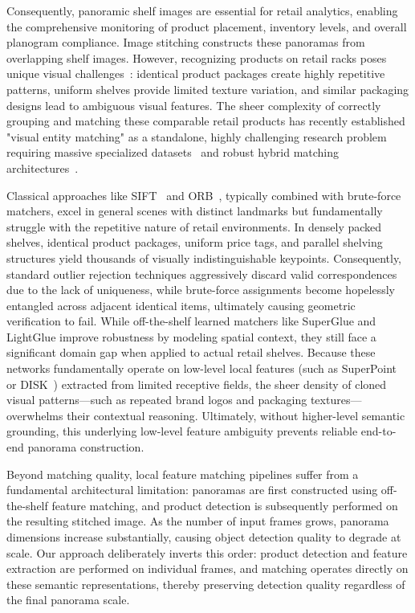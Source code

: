 \documentclass[10pt,twocolumn,letterpaper]{article}
\begin{document}
Consequently, panoramic shelf images are essential for retail analytics, enabling the comprehensive monitoring of product placement, inventory levels, and overall planogram compliance. Image stitching constructs these panoramas from overlapping shelf images. However, recognizing products on retail racks poses unique visual challenges~\cite{sinha2022improveddeeplearningapproach,article_multiModal,lamm2024retail786klargescaledatasetvisual}: identical product packages create highly repetitive patterns, uniform shelves provide limited texture variation, and similar packaging designs lead to ambiguous visual features. The sheer complexity of correctly grouping and matching these comparable retail products has recently established "visual entity matching" as a standalone, highly challenging research problem requiring massive specialized datasets~\cite{lamm2024retail786klargescaledatasetvisual} and robust hybrid matching architectures~\cite{kabadayi2025prismproductretrievalshopping}. 

Classical approaches like SIFT~\cite{sift} and ORB~\cite{orb}, typically combined with brute-force matchers, excel in general scenes with distinct landmarks but fundamentally struggle with the repetitive nature of retail environments. In densely packed shelves, identical product packages, uniform price tags, and parallel shelving structures yield thousands of visually indistinguishable keypoints. Consequently, standard outlier rejection techniques aggressively discard valid correspondences due to the lack of uniqueness, while brute-force assignments become hopelessly entangled across adjacent identical items, ultimately causing geometric verification to fail. {\color{red} While off-the-shelf learned matchers like SuperGlue \cite{superglue} and LightGlue \cite{lightglue} improve robustness by modeling spatial context, they still face a significant domain gap when applied to actual retail shelves.} Because these networks fundamentally operate on low-level local features (such as SuperPoint~\cite{DeTone_2018_CVPR_Workshops} or DISK~\cite{NEURIPS2020_a42a596f}) extracted from limited receptive fields, the sheer density of cloned visual patterns—such as repeated brand logos and packaging textures—overwhelms their contextual reasoning. Ultimately, without higher-level semantic grounding, this underlying low-level feature ambiguity prevents reliable end-to-end panorama construction.

Beyond matching quality, local feature matching pipelines suffer from a fundamental architectural limitation: panoramas are first constructed using off-the-shelf feature matching, and product detection is subsequently performed on the resulting stitched image. As the number of input frames grows, panorama dimensions increase substantially, causing object detection quality to degrade at scale. Our approach deliberately inverts this order: product detection and feature extraction are performed on individual frames, and matching operates directly on these semantic representations, thereby preserving detection quality regardless of the final panorama scale.
\end{document}
